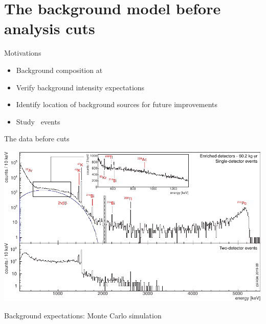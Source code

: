 \documentclass[10pt,aspectratio=169]{beamer}
\newcommand{\doi}[1]{\href{https://doi.org/#1}{\smaller\ttfamily #1}}
\begin{document}
\section{The background model before analysis cuts}
\begin{frame}{Motivations}
  \begin{itemize}
    \item Background composition at \qbb
    \item Verify background intensity expectations
    \item Identify location of background sources for future improvements
    \item Study \nnbb\ events
  \end{itemize}
\end{frame}
\begin{frame}[plain]{The data before cuts}
  \begin{center}
    \includegraphics[height=0.95\textheight]{plots/bkg/raw/ph2/dataGe-desc.pdf}
  \end{center}
\end{frame}
\begin{frame}{Background expectations: Monte Carlo simulation}
  \begin{center}
  \end{center}
\end{frame}
\end{document}
